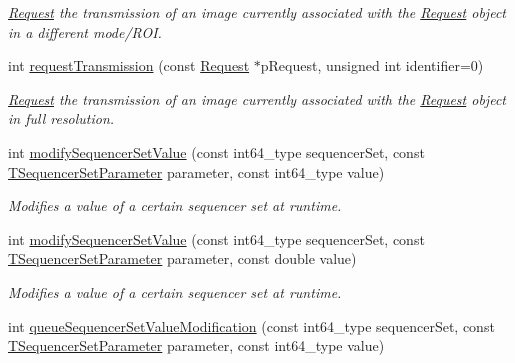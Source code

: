 \begin{DoxyCompactItemize}
\begin{DoxyCompactList}\small\item\em \hyperlink{classmv_i_m_p_a_c_t_1_1acquire_1_1_request}{Request} the transmission of an image currently associated with the \hyperlink{classmv_i_m_p_a_c_t_1_1acquire_1_1_request}{Request} object in a different mode/\+R\+O\+I. \end{DoxyCompactList}\item 
int \hyperlink{classmv_i_m_p_a_c_t_1_1acquire_1_1_gen_i_cam_1_1_custom_command_generator_a6674d9728120c72c12c24dbce05218d5}{request\+Transmission} (const \hyperlink{classmv_i_m_p_a_c_t_1_1acquire_1_1_request}{Request} $\ast$p\+Request, unsigned int identifier=0)
\begin{DoxyCompactList}\small\item\em \hyperlink{classmv_i_m_p_a_c_t_1_1acquire_1_1_request}{Request} the transmission of an image currently associated with the \hyperlink{classmv_i_m_p_a_c_t_1_1acquire_1_1_request}{Request} object in full resolution. \end{DoxyCompactList}\item 
int \hyperlink{classmv_i_m_p_a_c_t_1_1acquire_1_1_gen_i_cam_1_1_custom_command_generator_ad692d5d184f37b146f3da67faf1da770}{modify\+Sequencer\+Set\+Value} (const int64\+\_\+type sequencer\+Set, const \hyperlink{group___gen_i_cam_interface_ga458c2281fb19ba32fa6a49b02e0a976d}{T\+Sequencer\+Set\+Parameter} parameter, const int64\+\_\+type value)
\begin{DoxyCompactList}\small\item\em Modifies a value of a certain sequencer set at runtime. \end{DoxyCompactList}\item 
int \hyperlink{classmv_i_m_p_a_c_t_1_1acquire_1_1_gen_i_cam_1_1_custom_command_generator_ab96ac3a869cf35d312aeae089f04bc5c}{modify\+Sequencer\+Set\+Value} (const int64\+\_\+type sequencer\+Set, const \hyperlink{group___gen_i_cam_interface_ga458c2281fb19ba32fa6a49b02e0a976d}{T\+Sequencer\+Set\+Parameter} parameter, const double value)
\begin{DoxyCompactList}\small\item\em Modifies a value of a certain sequencer set at runtime. \end{DoxyCompactList}\item 
int \hyperlink{classmv_i_m_p_a_c_t_1_1acquire_1_1_gen_i_cam_1_1_custom_command_generator_ae18cd9ce7775ddb997e2a7c1414ded60}{queue\+Sequencer\+Set\+Value\+Modification} (const int64\+\_\+type sequencer\+Set, const \hyperlink{group___gen_i_cam_interface_ga458c2281fb19ba32fa6a49b02e0a976d}{T\+Sequencer\+Set\+Parameter} parameter, const int64\+\_\+type value)

\end{DoxyCompactItemize}
